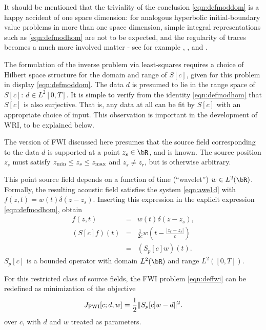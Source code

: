 It should be mentioned that the triviality of the conclusion
\ref{eqn:defmoddom} is a happy accident of one space dimension: for
analogous hyperbolic initial-boundary value problems in more than one
space dimension, simple integral representations such as
\ref{eqn:defmodhom} are not to be expected, and the regularity of
traces becomes a much more involved matter - see for example
\cite{Symes:83}, \cite{Lasi:87}, and \cite{BaoSy:91b}.

The formulation of the inverse problem via least-squares requires a
choice of Hilbert space structure for the domain and range of $S[c]$,
given for this problem in display \ref{eqn:defmoddom}.
The data $d$ is presumed to lie in the range space of
$S[c]$: $d \in L^2[0,T]$. It is simple to verify from the identity
\ref{eqn:defmodhom} that $S[c]$ is also surjective. That is, any data
at all can be fit by $S[c]$ with an appropriate choice of input. This
observation is important in the development of WRI, to be explained
below.

The version of FWI discussed here presumes that the source field
corresponding to the data $d$ is supported at a point $z_s \in \bR$,
and is known. The source position $z_s$ must satisfy $z_{\rm min} \le
z_s \le z_{\rm max}$ and $z_s \ne z_r$, but is otherwise arbitrary.

This point source field depends on a function of time (``wavelet'')
$w \in L^2(\bR)$. Formally, the resulting acoustic field satisfies the
system \ref{eqn:awe1d} with $f(z,t)=w(t)\delta(z-z_s)$. Inserting this
expression in the explicit expression \ref{eqn:defmodhom}, obtain
\begin{eqnarray}
  f(z,t) & = & w(t)\delta(z-z_s),\nonumber\\
  (S[c]f)(t) &=& \frac{1}{2c}w\left(t -
                              \frac{|z_r-z_s|}{c}\right)\nonumber\\
  &= &(S_p[c]w)(t).
  \label{eqn:defmodpt}
\end{eqnarray}
$S_p[c]$ is a bounded operator with domain $L^2(\bR)$ and range
$L^2([0,T])$.

For this restricted class of source fields, the FWI problem
\ref{eqn:deffwi} can be redefined as minimization of the objective
\begin{equation}
  \label{eqn:deffwipt}
  J_{\rm FWI}[c;d,w] = \frac{1}{2}\|S_p[c]w -d\|^2.
\end{equation}
over $c$, with $d$ and $w$ treated as parameters.

